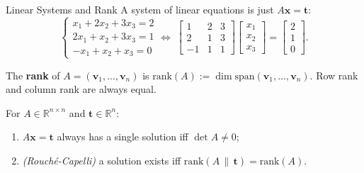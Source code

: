 \documentclass{zkdl-presentation-template}
\begin{document}
    \begin{frame}{Linear Systems and Rank}
        A system of linear equations is just $A\mathbf{x} = \mathbf{t}$:
        \begin{equation*}
            \begin{cases}
                x_1 + 2x_2 + 3x_3 = 2 \\
                2x_1 + x_2 + 3x_3 = 1 \\
                -x_1 + x_2 + x_3 = 0
            \end{cases}
            \Longleftrightarrow \;
            \begin{bmatrix}
                1 & 2 & 3 \\
                2 & 1 & 3 \\
                -1 & 1 & 1
            \end{bmatrix}\begin{bmatrix}
                x_1 \\ x_2 \\ x_3
            \end{bmatrix} = \begin{bmatrix}
                2 \\ 1 \\ 0
            \end{bmatrix}.
        \end{equation*}
        \pause

        \begin{definition}
            The \textbf{rank} of $A = (\mathbf{v}_1,\dots,\mathbf{v}_n)$ is $\text{rank}(A) := \dim \text{span}(\mathbf{v}_1,\dots,\mathbf{v}_n)$. Row rank and column rank are always equal.
        \end{definition}
        \pause

        \begin{proposition}
            For $A \in \mathbb{R}^{n \times n}$ and $\mathbf{t} \in \mathbb{R}^n$:
            \begin{enumerate}
                \item $A\mathbf{x} = \mathbf{t}$ always has a single solution iff $\det A \neq 0$;
                \item \textit{(Rouché-Capelli)} a solution exists iff $\text{rank}(A \,\|\, \mathbf{t}) = \text{rank}(A)$.
            \end{enumerate}
        \end{proposition}
    \end{frame}
\end{document}
